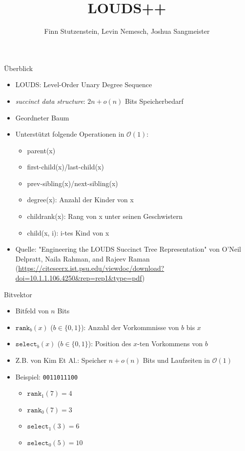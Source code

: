 \documentclass[ngerman,aspectratio=169,10pt]{beamer}
\title{LOUDS++}
\author{Finn Stutzenstein, Levin Nemesch, Joshua Sangmeister}
\institute{Algorithm Engineering - Übung 2}
\begin{document}
\maketitle

\begin{frame}{Überblick}
    \begin{itemize}
        \item LOUDS: Level-Order Unary Degree Sequence
        \item \emph{succinct data structure}: $2n + o(n)$ Bits Speicherbedarf
        \item Geordneter Baum
        \item Unterstützt folgende Operationen in $\mathcal{O}(1)$:
        \begin{itemize}
            \item parent(x)
            \item first-child(x)/last-child(x)
            \item prev-sibling(x)/next-sibling(x)
            \item degree(x): Anzahl der Kinder von x
            \item childrank(x): Rang von x unter seinen Geschwistern
            \item child(x, i): i-tes Kind von x
        \end{itemize}
    	\item Quelle: "Engineering the LOUDS Succinct Tree Representation" von O'Neil Delpratt, Naila Rahman, and Rajeev Raman (\url{https://citeseerx.ist.psu.edu/viewdoc/download?doi=10.1.1.106.4250&rep=rep1&type=pdf})
    \end{itemize}
\end{frame}

\begin{frame}{Bitvektor}
    \begin{itemize}
        \item<1-> Bitfeld von $n$ Bits
        \item<1-> $\texttt{rank}_b(x)$ ($b\in\{0,1\}$): Anzahl der Vorkommnisse von $b$ bis $x$
        \item<1-> $\texttt{select}_b(x)$ ($b\in\{0,1\}$): Position des $x$-ten Vorkommens von $b$
        \item<1-> Z.B. von Kim Et Al.: Speicher $n+o(n)$ Bits und Laufzeiten in $\mathcal{O}(1)$
        \item<2-> Beispiel: \texttt{0011011100}
            \begin{itemize}
                \item $\texttt{rank}_1(7)=4$
                \item $\texttt{rank}_0(7)=3$
                \item $\texttt{select}_1(3)=6$
                \item $\texttt{select}_0(5)=10$
            \end{itemize}
    \end{itemize}
\end{frame}
\end{document}
